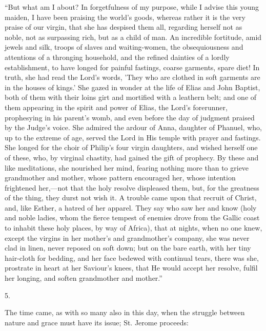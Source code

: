 ``But what am I about? In forgetfulness of my purpose, while I
advise this young maiden, I have been praising the world's goods,
whereas rather it is the very praise of our virgin, that she has
despised them all, regarding herself not as noble, not as surpassing
rich, but as a child of man. An incredible fortitude, amid jewels and
silk, troops of slaves and waiting-women, the obsequiousness and
attentions of a thronging household, and the refined dainties of a
lordly establishment, to have longed for painful fastings, coarse
garments, spare diet! In truth, she had read the Lord's words, 'They
who are clothed in soft garments are in the houses of kings.' She
gazed in wonder at the life of Elias and John Baptist, both of them
with their loins girt and mortified with a leathern belt; and one of
them appearing in the spirit and power of Elias, the Lord's
forerunner, prophesying in his parent's womb, and even before the day
of judgment praised by the Judge's voice. She admired the ardour of
Anna, daughter of Phanuel, who, up to the extreme of age, served the
Lord in His temple with prayer and fastings. She longed for the choir
of Philip's four virgin daughters, and wished herself one of these,
who, by virginal chastity, had gained the gift of prophecy. By these
and like meditations, she nourished her mind, fearing nothing more
than to grieve grandmother and mother, whose pattern encouraged her,
whose intention frightened her,—not that the holy resolve displeased
them, but, for the greatness of the thing, they durst not wish it. A
trouble came upon that recruit of Christ, and, like Esther, a hatred
of her apparel. They say who saw her and know (holy and noble ladies,
whom the fierce tempest of enemies drove from the Gallic coast to
inhabit these holy places, by way of Africa), that at nights, when no
one knew, except the virgins in her mother's and grandmother's
company, she was never clad in linen,
never reposed on soft down; but on the bare earth, with her tiny
hair-cloth for bedding, and her face bedewed with continual tears,
there was she, prostrate in heart at her Saviour's knees, that He
would accept her resolve, fulfil her longing, and soften grandmother
and mother.''

5.

The time came, as with so many also in this day, when the struggle
between nature and grace must have its issue; St. Jerome proceeds:

